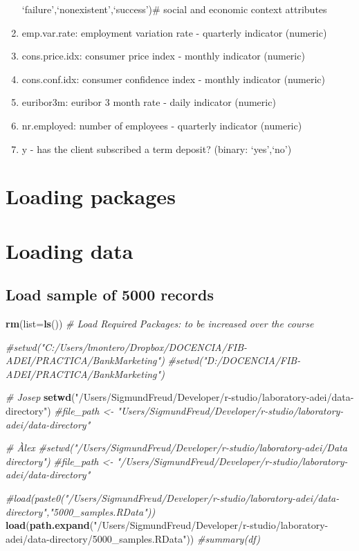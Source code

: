 \documentclass[]{article}
\newenvironment{Shaded}{\begin{snugshade}}{\end{snugshade}}
\newcommand{\KeywordTok}[1]{\textcolor[rgb]{0.13,0.29,0.53}{\textbf{#1}}}
\newcommand{\DataTypeTok}[1]{\textcolor[rgb]{0.13,0.29,0.53}{#1}}
\newcommand{\StringTok}[1]{\textcolor[rgb]{0.31,0.60,0.02}{#1}}
\newcommand{\CommentTok}[1]{\textcolor[rgb]{0.56,0.35,0.01}{\textit{#1}}}
\newcommand{\NormalTok}[1]{#1}
\begin{document}
\begin{enumerate}
  `failure',`nonexistent',`success')\# social and economic context
  attributes
\item
  emp.var.rate: employment variation rate - quarterly indicator
  (numeric)
\item
  cons.price.idx: consumer price index - monthly indicator (numeric)
\item
  cons.conf.idx: consumer confidence index - monthly indicator (numeric)
\item
  euribor3m: euribor 3 month rate - daily indicator (numeric)
\item
  nr.employed: number of employees - quarterly indicator (numeric)
\item
  y - has the client subscribed a term deposit? (binary: `yes',`no')
\end{enumerate}

\section{Loading packages}\label{loading-packages}

\section{Loading data}\label{loading-data}

\subsection{Load sample of 5000
records}\label{load-sample-of-5000-records}

\begin{Shaded}
\begin{Highlighting}[]
\KeywordTok{rm}\NormalTok{(}\DataTypeTok{list=}\KeywordTok{ls}\NormalTok{())}
\CommentTok{# Load Required Packages: to be increased over the course}

\CommentTok{#setwd("C:/Users/lmontero/Dropbox/DOCENCIA/FIB-ADEI/PRACTICA/BankMarketing")}
\CommentTok{#setwd("D:/DOCENCIA/FIB-ADEI/PRACTICA/BankMarketing")}

\CommentTok{# Josep}
\KeywordTok{setwd}\NormalTok{(}\StringTok{"/Users/SigmundFreud/Developer/r-studio/laboratory-adei/data-directory"}\NormalTok{)}
\CommentTok{#file_path <- "Users/SigmundFreud/Developer/r-studio/laboratory-adei/data-directory"}

\CommentTok{# Àlex}
\CommentTok{#setwd("/Users/SigmundFreud/Developer/r-studio/laboratory-adei/Data directory")}
\CommentTok{#file_path <- "/Users/SigmundFreud/Developer/r-studio/laboratory-adei/data-directory"}

\CommentTok{#load(paste0("/Users/SigmundFreud/Developer/r-studio/laboratory-adei/data-directory","5000_samples.RData"))}
\KeywordTok{load}\NormalTok{(}\KeywordTok{path.expand}\NormalTok{(}\StringTok{"/Users/SigmundFreud/Developer/r-studio/laboratory-adei/data-directory/5000_samples.RData"}\NormalTok{))}
\CommentTok{#summary(df)}
\end{Highlighting}
\end{Shaded}
\end{document}
